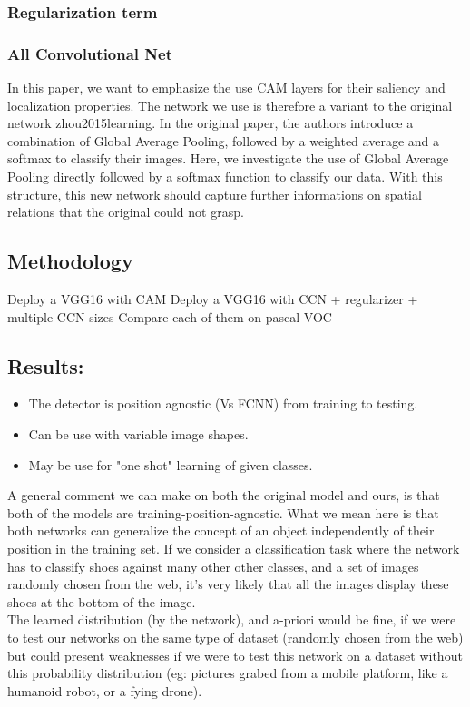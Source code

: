 			
			
			\subsubsection{Regularization term}
			\label{ssub:regularization_term}


			\subsubsection{All Convolutional Net}
			\label{ssub:all_convolutional_net}

			
			


	In this paper, we want to emphasize the use CAM layers for their saliency and localization properties.
	The network we use is therefore a variant to the original network zhou2015learning. In the original paper, the authors introduce a combination of Global Average Pooling, followed by a weighted average and a softmax to classify their images. Here, we investigate the use of Global Average Pooling directly followed by a softmax function to classify our data. With this structure, this new network should capture further informations on spatial relations that the original could not grasp.

	\subsection{Methodology} %
	\label{sub:methodology}

		Deploy a VGG16 with CAM 
		Deploy a VGG16 with CCN + regularizer + multiple CCN sizes
		Compare each of them on pascal VOC

	\subsection{Results:} %
	\label{sub:results_}
		
		\begin{itemize}
			\item The detector is position agnostic (Vs FCNN) from training to testing.
			\item Can be use with variable image shapes.
			\item May be use for "one shot" learning of given classes.
		\end{itemize}

	A general comment we can make on both the original model and ours, is that both of the models are training-position-agnostic. What we mean here is that both networks can generalize the concept of an object independently of their position in the training set. If we consider a classification task where the network has to classify shoes against many other other classes, and a set of images randomly chosen from the web, it's very likely that all the images display these shoes at the bottom of the image.\\
	The learned distribution (by the network), and a-priori would be fine, if we were to test our networks on the same type of dataset (randomly chosen from the web) but could present weaknesses if we were to test this network on a dataset without this probability distribution (eg: pictures grabed from a mobile platform, like a humanoid robot, or a fying drone).
